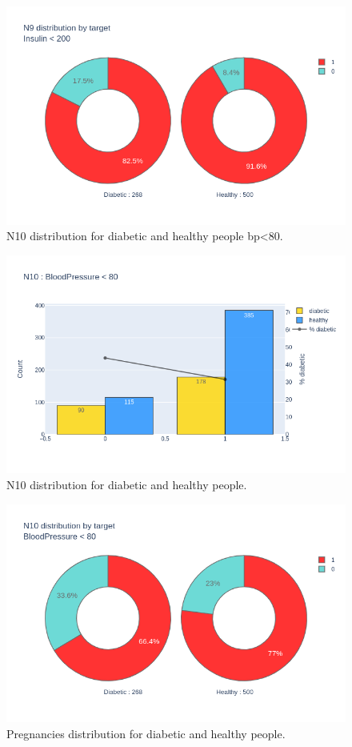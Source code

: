 \documentclass[12pt]{article}
\begin{document}
\begin{figure}[ht]
\centering
\includegraphics[width=1\textwidth]{newplot(33).png}
\caption{N10 distribution for diabetic and healthy people bp<80.}
\end{figure}

\begin{figure}[ht]
\centering
\includegraphics[width=1\textwidth]{newplot(34).png}
\caption{N10 distribution for diabetic and healthy people.}
\end{figure}

\begin{figure}[ht]
\centering
\includegraphics[width=1\textwidth]{newplot(35).png}
\caption{Pregnancies distribution for diabetic and healthy people.}
\end{figure}
\end{document}

